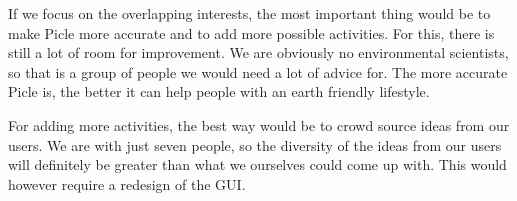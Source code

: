 If we focus on the overlapping interests, the most important thing would be to make Picle
more accurate and to add more possible activities. For this, there is still a lot of room
for improvement. We are obviously no environmental scientists, so that is a group of
people we would need a lot of advice for. The more accurate Picle is, the better it can
help people with an earth friendly lifestyle.

For adding more activities, the best way would be to crowd source ideas from our users.
We are with just seven people, so the diversity of the ideas from our users will definitely
be greater than what we ourselves could come up with. This would however require a
redesign of the GUI.
